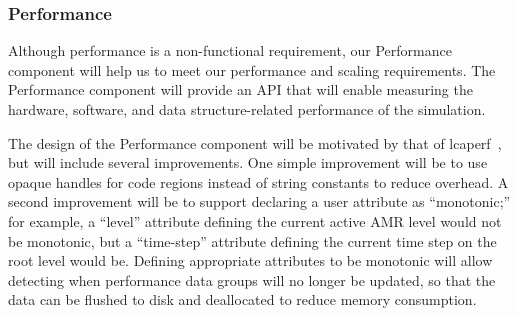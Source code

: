 \documentclass[11pt,letterpaper]{article}
\newcommand{\code}[1]{\textsf{#1}}
\begin{document}
% 

\subsubsection{Performance} \label{sss:design-performance}

Although performance is a non-functional requirement, our
\code{Performance} component will help us to meet our performance and
scaling requirements.  The \code{Performance} component will provide
an API that will enable measuring the hardware, software, and data
structure-related performance of the simulation.

The design of the \code{Performance} component will be motivated by
that of \code{lcaperf}~\cite{wwwlcaperf}, but will include several
improvements.  One simple improvement will be to use opaque handles
for code regions instead of string constants to reduce overhead.  A
second improvement will be to support declaring a user attribute as
``monotonic;'' for example, a ``\code{level}'' attribute defining the
current active AMR level would not be monotonic, but a
``\code{time-step}'' attribute defining the current time step on the
root level would be.  Defining appropriate attributes to be monotonic
will allow detecting when performance data groups will no longer be
updated, so that the data can be flushed to disk and deallocated to
reduce memory consumption.
\end{document}

